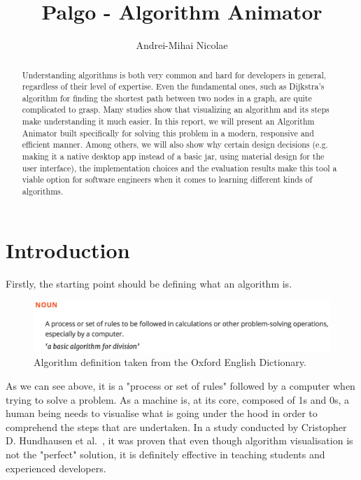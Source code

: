 \documentclass{l4proj}
\begin{document}
\title{Palgo - Algorithm Animator}
\author{Andrei-Mihai Nicolae}
\maketitle

\begin{abstract}
Understanding algorithms is both very common and hard for developers in general,
regardless of their level of expertise. Even the fundamental ones, such as Dijkstra's algorithm
for finding the shortest path between two nodes in a graph, are quite complicated to grasp. Many
studies show that visualizing an algorithm and its steps make understanding it much easier. In
this report, we will present an Algorithm Animator built specifically for solving this problem
in a modern, responsive and efficient manner. Among others, we will also show why certain design decisions (e.g. making it a native
desktop app instead of a basic jar, using material design for the user interface), the implementation choices and the
evaluation results make this tool a viable option for software engineers when it comes to learning different kinds of
algorithms.
\end{abstract}

\educationalconsent

\tableofcontents
\chapter{Introduction}
\label{intro}

Firstly, the starting point should be defining what an algorithm is.

\begin{figure}[!ht]
\centering
\includegraphics[scale=0.5]{algorithm}
\caption{Algorithm definition taken from the Oxford English Dictionary.}
\label{fig:algorithm}
\end{figure}

As we can see above, it is a "process or set of rules" followed by a computer when trying to solve a problem. As a machine is, at its core, composed of 1s and 0s, a human being needs to visualise what is going under the hood in order to comprehend the steps that are undertaken. In a study conducted by Cristopher D. Hundhausen et al.~\cite{av}, it was proven that even though algorithm visualisation is not the "perfect" solution, it is definitely effective in teaching students and experienced developers.
\end{document}
